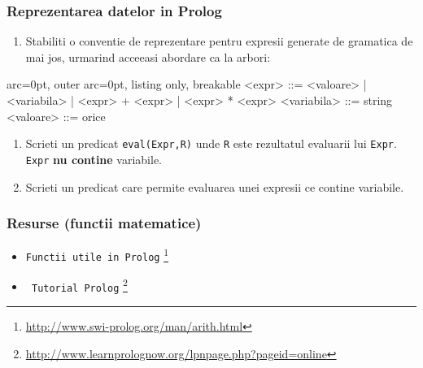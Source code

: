 \subsubsection*{ Reprezentarea datelor in Prolog }
\begin{enumerate}
	\item  Stabiliti o conventie de reprezentare pentru expresii generate de gramatica de mai jos, urmarind acceeasi abordare ca la arbori:
\end{enumerate}

\begin{tcblisting}{ arc=0pt, outer arc=0pt, listing only, breakable}
   <expr> ::= <valoare> | <variabila> | <expr> + <expr> | <expr> * <expr> 
   <variabila> ::= string
   <valoare> ::= orice

\end{tcblisting}

\begin{enumerate}
	\item  Scrieti un predicat \texttt{eval(Expr,R)} unde \texttt{R} este rezultatul evaluarii lui \texttt{Expr}. \texttt{Expr} \textbf{nu contine} variabile.
	\item  Scrieti un predicat care permite evaluarea unei expresii ce contine variabile.
\end{enumerate}


\subsubsection*{ Resurse (functii matematice) }
\begin{itemize}
	\item  \texttt{Functii utile in Prolog} \footnote{\url{http://www.swi-prolog.org/man/arith.html}}
	\item  \texttt{ Tutorial Prolog} \footnote{\url{http://www.learnprolognow.org/lpnpage.php?pageid=online}}
\end{itemize}
